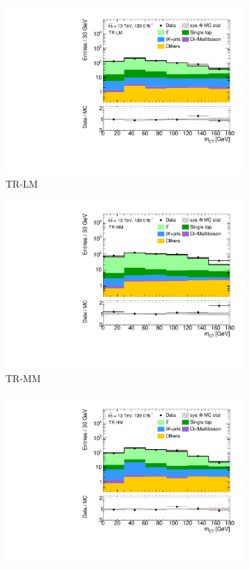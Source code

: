  \begin{figure}
	\centering
	\begin{subfigure}[b]{0.5\linewidth}
		\centering\includegraphics[width=1.0\textwidth]{1Lbb_TR-LM_mct}
		\caption{TR-LM\label{fig:prefit_TRLM}}
	\end{subfigure}\hfill
	\begin{subfigure}[b]{0.5\linewidth}
		\centering\includegraphics[width=1.0\textwidth]{1Lbb_TR-MM_mct}
		\caption{TR-MM\label{fig:prefit_TRMM}}
	\end{subfigure}\hfill
	\begin{subfigure}[b]{0.5\linewidth}
		\centering\includegraphics[width=1.0\textwidth]{1Lbb_TR-HM_mct}

\end{subfigure}
\end{figure}
